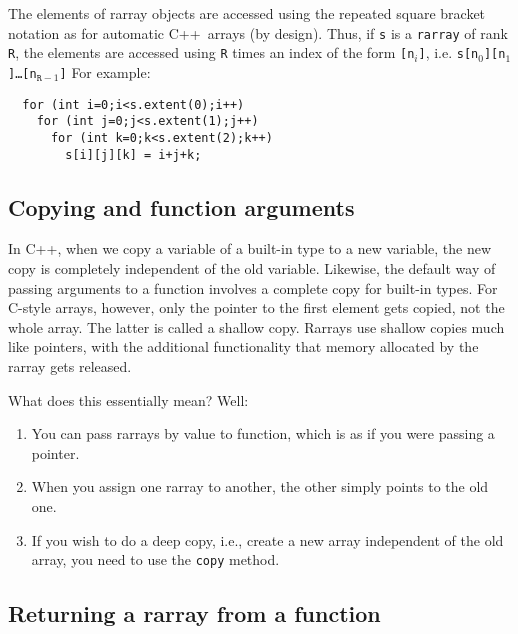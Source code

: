 \documentclass[11pt,twoside]{article}
\newcommand{\cxx}{C{++}}
\begin{document}
The elements of rarray objects are accessed using the repeated square
bracket notation as for automatic \cxx\ arrays (by design). Thus, if \texttt{s} is a \texttt{rarray} of rank \texttt R, the elements are accessed using \texttt{R} times an index of the form \texttt{[n$_i$]}, i.e. \texttt{s[n$_0$][n$_1$]\dots[n$_{\texttt{R}-1}$]}
For example:\vspace{-9pt}
\begin{framed}\vspace{-18pt}%
\begin{verbatim}
  for (int i=0;i<s.extent(0);i++)
    for (int j=0;j<s.extent(1);j++)
      for (int k=0;k<s.extent(2);k++)
        s[i][j][k] = i+j+k;
\end{verbatim}%
\vspace{-12pt}
\end{framed}%

\subsection{Copying and function arguments}

In C++, when we copy a variable of a built-in type to a new variable, the new copy is completely independent of the old variable. Likewise, the default way of passing arguments to a function involves a complete copy for built-in types.  For C-style arrays, however, only the pointer to the first element gets copied, not the whole array. The latter is called a shallow copy. Rarrays use shallow copies much like pointers, with the additional functionality that memory allocated by the rarray gets released. 

What does this essentially mean? Well:
\begin{enumerate}
\item You can pass rarrays by value to function, which is as if you were passing a pointer.
\item When you assign one rarray to another, the other simply points to the old one.
\item If you wish to do a deep copy, i.e., create a new array independent of the old array, you need to use the \texttt{copy} method.
\end{enumerate}

\subsection{Returning a rarray from a function\label{returnvalues}}
\end{document}
